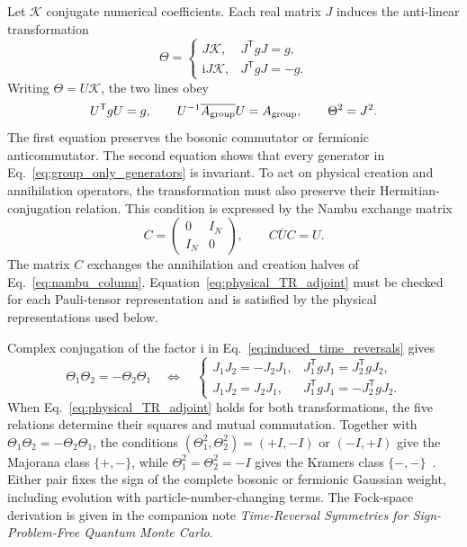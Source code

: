 \documentclass[onecolumn,aps,prb,amsmath,amssymb,superscriptaddress,longbibliography,floatfix]{revtex4-2}
\newcommand{\ii}{\mathrm{i}}
\newcommand{\trans}{\mathsf{T}}
\newcommand{\mc}[1]{\mathcal{#1}}
\begin{document}
Let \(\mc K\) conjugate numerical coefficients.  Each real matrix \(J\) induces the anti-linear transformation
\begin{equation}
\Theta=\begin{cases}
J\mc K,&J^\trans gJ=g,\\
\ii J\mc K,&J^\trans gJ=-g.
\end{cases}
\label{eq:induced_time_reversals}
\end{equation}
Writing \(\Theta=U\mc K\), the two lines obey
\begin{equation}
U^\trans gU=g,\qquad
U^{-1}\overline{A_{\rm group}}U=A_{\rm group},\qquad
\Theta^2=J^2.
\label{eq:TR_canonical_and_invariant}
\end{equation}
The first equation preserves the bosonic commutator or fermionic anticommutator.  The second equation shows that every generator in Eq.~\eqref{eq:group_only_generators} is invariant.  To act on physical creation and annihilation operators, the transformation must also preserve their Hermitian-conjugation relation.  This condition is expressed by the Nambu exchange matrix
\begin{equation}
C=\begin{pmatrix}0&I_N\\ I_N&0\end{pmatrix},\qquad
C\overline U C=U.
\label{eq:physical_TR_adjoint}
\end{equation}
The matrix \(C\) exchanges the annihilation and creation halves of Eq.~\eqref{eq:nambu_column}.  Equation~\eqref{eq:physical_TR_adjoint} must be checked for each Pauli-tensor representation and is satisfied by the physical representations used below.

Complex conjugation of the factor \(\ii\) in Eq.~\eqref{eq:induced_time_reversals} gives
\begin{equation}
\Theta_1\Theta_2=-\Theta_2\Theta_1
\quad\Longleftrightarrow\quad
\begin{cases}
J_1J_2=-J_2J_1,
&J_1^\trans gJ_1=J_2^\trans gJ_2,\\
J_1J_2=J_2J_1,
&J_1^\trans gJ_1=-J_2^\trans gJ_2.
\end{cases}
\label{eq:induced_TR_anticommutation}
\end{equation}
When Eq.~\eqref{eq:physical_TR_adjoint} holds for both transformations, the five relations determine their squares and mutual commutation.  Together with \(\Theta_1\Theta_2=-\Theta_2\Theta_1\), the conditions \((\Theta_1^2,\Theta_2^2)=(+I,-I)\) or \((-I,+I)\) give the Majorana class \(\{+,-\}\), while \(\Theta_1^2=\Theta_2^2=-I\) gives the Kramers class \(\{-,-\}\)~\cite{li2016prl}.  Either pair fixes the sign of the complete bosonic or fermionic Gaussian weight, including evolution with particle-number-changing terms.  The Fock-space derivation is given in the companion note \textit{Time-Reversal Symmetries for Sign-Problem-Free Quantum Monte Carlo}.
\end{document}
